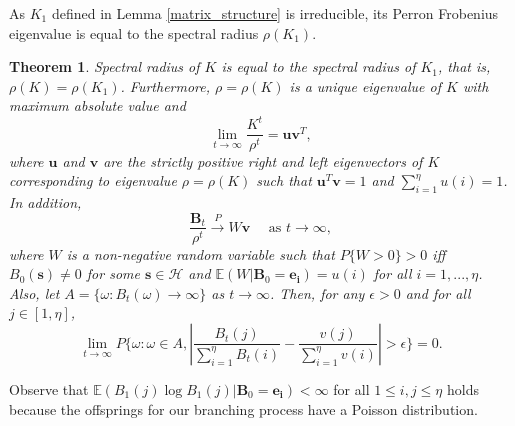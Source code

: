 \documentclass{article}
\newtheorem{theorem}{Theorem}[section]
\theoremstyle{definition}
\newcommand{\lrp}[1]{\left({#1}\right)}
\newcommand{\abs}[1]{\left\lvert{#1}\right\rvert}
\newcommand{\Exp}[1]{\mathbb{E}\lrp{#1}}
\begin{document}
 

 



 As $K_1$ defined in Lemma \ref{matrix_structure} is irreducible, its Perron Frobenius eigenvalue is equal to the spectral radius $\rho(K_1)$.
 
  \begin{theorem}
 Spectral radius of $K$ is equal to the spectral radius of $K_1$, that is, $\rho(K) =\rho(K_1)$. Furthermore, $\rho= \rho(K)$ is a unique eigenvalue of $K$ with maximum absolute value and 
\[ \lim_{t \to \infty} \frac{K^t}{\rho^t} = \bm{u}\bm{v}^T,\]
where $\bm{u}$ and $\bm{v}$ are the strictly positive right and left eigenvectors of $K$ corresponding to eigenvalue $\rho=\rho(K)$ such that $\bm{u}^T\bm{v}=1$ and $\sum_{i=1}^{\eta}{u}(i) = 1$. In addition,        
      \begin{equation*}
       \frac{\bm{B}_t}{\rho^t} \xrightarrow{P} W\bm{v} \quad \text{ as } t \to \infty,
       \end{equation*} 
      where $W$ is a non-negative random variable such that $P\{W>0\}>0$ iff $B_0(\bm{s})\neq0$ for some $\bm{s} \in \mathcal H$ and $\Exp{W|\bm{B}_0=\bm{e_i}} = u(i)$ for all $i=1,...,\eta$. Also, 
  let $A=\{\omega:B_t(\omega) \to \infty\}$ as $t \to \infty$. Then, for any $\epsilon > 0$ and for all $j\in[1,\eta]$,
  \begin{equation*}\lim_{t\to \infty} P \{ \omega : \omega \in A, \abs{\frac{{B}_t(j)}{\sum_{i=1}^{\eta}B_t(i)}-\frac{{v}(j)}{\sum_{i=1}^{\eta}v(i)}}>\epsilon \}=0.
  \end{equation*} 
   \label{theorem_extending_branching_process}  
 \end{theorem}
 
Observe that  
 $
   \Exp{{B}_1(j)\log {B}_1(j)|\bm{{B}}_0=\bm{e_i}}<\infty 
   $
    for all $ 1\leq i,j\leq {\eta}$ holds  because the offsprings for our branching process have a Poisson distribution.
    
\end{document}
